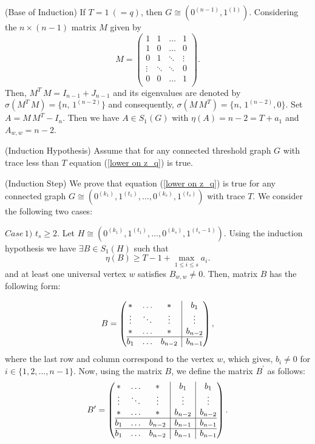 \documentclass[3p,times,12pt]{article}
\begin{document}
(Base of Induction) If $T=1~(=q)$, then  $G\cong (0^{(n-1)},1^{(1)})$. Considering the $n \times (n-1)$ matrix $M$ given by
$$M=\left(
  \begin{array}{cccc}
    1 &   1  & \ldots & 1  \\
    1 &   0    & \ldots & 0  \\
    0 &   1    & \ddots &  \vdots  \\
    \vdots &  \ddots    & \ddots &  0  \\
    0 &   0    & \ldots &  1 \\
  \end{array}
\right).$$ Then, $M^T\,M=I_{n-1}+J_{n-1}$ and its eigenvalues are denoted by $\sigma(M^T\,M)=\{n,\, 1^{(n-2)}\}$ and consequently, $\sigma(M\,M^T)=\{n,\, 1^{(n-2)},0\}$. Set $A=M\,M^T-I_n$. Then we have $A\in S_1(G)$ with $\eta(A)=n-2=T+a_1$ and $A_{w,w}=n-2$. 

\vspace{3mm}

(Induction Hypothesis) Assume that for any connected threshold graph $G$ with trace less than $T$ equation (\ref{lower on z_q}) is true. 
 
\vspace{3mm} 
 
(Induction Step) We prove that equation (\ref{lower on z_q}) is true for any connected  graph $G\cong (0^{(k_1)}, 1^{(t_1)}, \ldots,0^{(k_s)}, 1^{(t_s)})$ with trace  $T$. We consider the following two cases:

\vspace{3mm} 

$Case\, 1)$ $t_s\ge 2$. Let $H\cong (0^{(k_1)}, 1^{(t_1)}, \ldots,0^{(k_s)}, 1^{(t_{s}-1)})$. Using the induction hypothesis we have 
 $\exists B\in S_1(H)$ such that
 \begin{equation}\label{z_q1}
\eta(B)\ge T-1+\max_{1\le i \le s}a_i.
 \end{equation}
  and at least one universal vertex $w$ satisfies $B_{w,w}\neq 0$. Then, matrix $B$ has the following form:
  
   $$B= \left(\begin{array}{@{}ccc|c@{}}
    * & \ldots & *& b_1  \\
    \vdots & \ddots & \vdots & \vdots  \\
    * & \ldots & * & b_{n-2}  \\\hline
    b_1 & \ldots & b_{n-2} & b_{n-1}  \\
  \end{array}\right),$$  where the last row and column correspond to the vertex $w$, which gives,  $b_i\neq 0$ for $i\in \{1,2,\ldots, n-1\}$. Now, using the matrix $B$, we define the matrix $B^{\prime}$ as follows: 
 $$B^{\prime}= \left(\begin{array}{@{}ccc|c|c@{}}
    * & \ldots & *& b_1 & b_1 \\
    \vdots & \ddots & \vdots & \vdots & \vdots \\
    * & \ldots & * & b_{n-2} & b_{n-2} \\\hline
    b_1 & \ldots & b_{n-2} & b_{n-1} & b_{n-1} \\\hline
    b_1 & \ldots & b_{n-2} & b_{n-1} & b_{n-1} 
  \end{array}\right).$$
\end{document}
